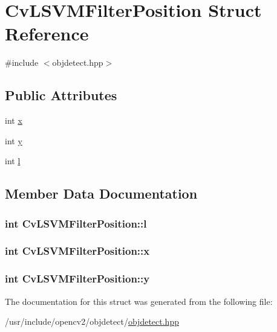\hypertarget{structCvLSVMFilterPosition}{\section{Cv\-L\-S\-V\-M\-Filter\-Position Struct Reference}
\label{structCvLSVMFilterPosition}
}


{\ttfamily \#include $<$objdetect.\-hpp$>$}

\subsection*{Public Attributes}
\begin{DoxyCompactItemize}
\item 
int \hyperlink{structCvLSVMFilterPosition_a098330e8a5fc42608b873353ab0ee011}{x}
\item 
int \hyperlink{structCvLSVMFilterPosition_a9486778131de94be8e2c81536a8fb98e}{y}
\item 
int \hyperlink{structCvLSVMFilterPosition_aa0da6f3cd6fc53e57348a531135d166b}{l}
\end{DoxyCompactItemize}


\subsection{Member Data Documentation}
\hypertarget{structCvLSVMFilterPosition_aa0da6f3cd6fc53e57348a531135d166b}{
\subsubsection[{l}]{\setlength{\rightskip}{0pt plus 5cm}int Cv\-L\-S\-V\-M\-Filter\-Position\-::l}}\label{structCvLSVMFilterPosition_aa0da6f3cd6fc53e57348a531135d166b}
\hypertarget{structCvLSVMFilterPosition_a098330e8a5fc42608b873353ab0ee011}{
\subsubsection[{x}]{\setlength{\rightskip}{0pt plus 5cm}int Cv\-L\-S\-V\-M\-Filter\-Position\-::x}}\label{structCvLSVMFilterPosition_a098330e8a5fc42608b873353ab0ee011}
\hypertarget{structCvLSVMFilterPosition_a9486778131de94be8e2c81536a8fb98e}{
\subsubsection[{y}]{\setlength{\rightskip}{0pt plus 5cm}int Cv\-L\-S\-V\-M\-Filter\-Position\-::y}}\label{structCvLSVMFilterPosition_a9486778131de94be8e2c81536a8fb98e}


The documentation for this struct was generated from the following file\-:\begin{DoxyCompactItemize}
\item 
/usr/include/opencv2/objdetect/\hyperlink{objdetect_8hpp}{objdetect.\-hpp}\end{DoxyCompactItemize}
